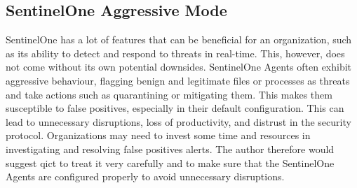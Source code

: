 



\subsection{SentinelOne Aggressive Mode}
SentinelOne has a lot of features that can be beneficial for an organization, such as its ability to detect and respond to threats in real-time.
This, however, does not come without its own potential downsides. SentinelOne Agents often exhibit aggressive behaviour, flagging benign and legitimate
files or processes as threats and take actions such as quarantining or mitigating them. This makes them susceptible to false positives,
especially in their default configuration. This can lead to unnecessary disruptions, loss of productivity, and distrust in the security protocol. Organizations
may need to invest some time and resources in investigating and resolving false positives alerts. The author therefore would suggest \acrshort{qict} to
treat it very carefully and to make sure that the SentinelOne Agents are configured properly to avoid unnecessary disruptions.

